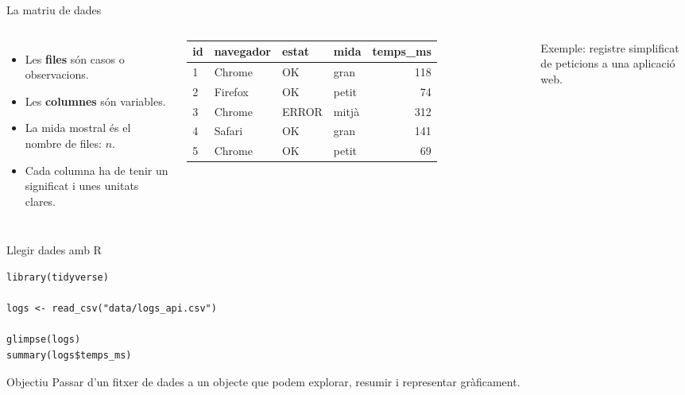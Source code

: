 \documentclass[10pt,aspectratio=169]{beamer}
\newcommand{\important}[1]{\textcolor{UABGreen}{\textbf{#1}}}
\begin{document}
\begin{frame}{La matriu de dades}
\begin{columns}[T]
\begin{itemize}
  \item Les \important{files} són casos o observacions.
  \item Les \important{columnes} són variables.
  \item La mida mostral és el nombre de files: $n$.
  \item Cada columna ha de tenir un significat i unes unitats clares.
\end{itemize}

\centering
\small
\begin{tabular}{llllr}
\toprule
id & navegador & estat & mida & temps\_ms \\
\midrule
1 & Chrome  & OK    & gran  & 118 \\
2 & Firefox & OK    & petit & 74 \\
3 & Chrome  & ERROR & mitjà & 312 \\
4 & Safari  & OK    & gran  & 141 \\
5 & Chrome  & OK    & petit & 69 \\
\bottomrule
\end{tabular}
\vspace{0.2cm}

\scriptsize Exemple: registre simplificat de peticions a una aplicació web.
\end{columns}
\end{frame}

\begin{frame}[fragile]{Llegir dades amb R}
\begin{lstlisting}
library(tidyverse)

logs <- read_csv("data/logs_api.csv")

glimpse(logs)
summary(logs$temps_ms)
\end{lstlisting}
\vspace{0.3cm}
\begin{block}{Objectiu}
Passar d'un fitxer de dades a un objecte que podem explorar, resumir i representar gràficament.
\end{block}
\end{frame}

\end{document}
